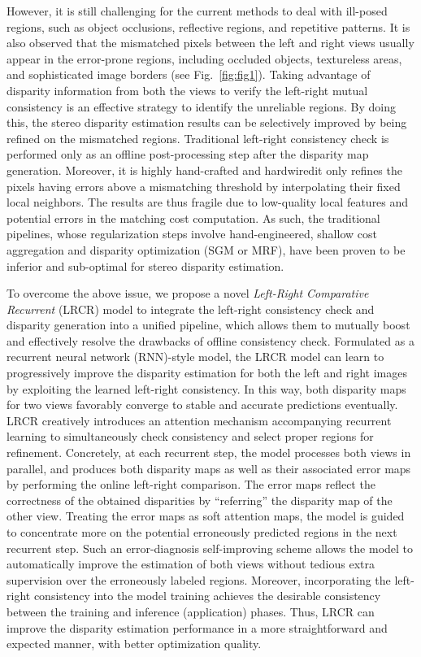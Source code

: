\documentclass[10pt,twocolumn,letterpaper]{article}
\begin{document}
However, it is still challenging for the current methods to deal with ill-posed regions, such as object occlusions, reflective regions, and repetitive patterns.  It is also observed that the mismatched pixels between the left and right views usually appear in the error-prone regions, including occluded objects, textureless areas, and sophisticated image borders (see Fig.~\ref{fig:fig1}).   Taking advantage of disparity information from  both the views to verify the left-right mutual consistency  is an effective strategy to identify the unreliable regions. By doing this,  the stereo disparity estimation results can be selectively improved by being refined on the mismatched regions. Traditional left-right consistency check is performed only as an offline post-processing step after the disparity map generation. Moreover, it is highly hand-crafted and hardwired\textemdash it only refines the pixels having errors   above a   mismatching threshold by interpolating their fixed local neighbors. The results are thus fragile due to low-quality local features and potential errors in the matching cost computation.  As such,  the traditional pipelines, whose regularization steps involve hand-engineered, shallow cost aggregation and disparity optimization (SGM or MRF), have been proven to be inferior \cite{seki2016patch} and sub-optimal for  stereo disparity estimation. 

To overcome the above issue, we propose a novel \textit{Left-Right Comparative Recurrent} (LRCR) model to integrate the left-right consistency check and disparity generation into a unified pipeline, which allows them to mutually boost and effectively resolve the drawbacks of   offline  consistency check. Formulated as a recurrent neural network (RNN)-style model, the LRCR model can learn to progressively improve the disparity estimation for both the left and right images by exploiting  the learned left-right consistency. In this way, both  disparity maps for two views favorably converge to stable and accurate predictions eventually. LRCR creatively introduces an  attention mechanism accompanying recurrent learning to  simultaneously check consistency  and select proper regions for refinement. Concretely,  at each recurrent step, the model processes both views in parallel, and produces both disparity maps as well as their associated error maps by performing the online left-right comparison. The error maps reflect the correctness of the obtained disparities by ``referring'' the disparity map of the other view. Treating the error maps as  soft attention maps, the model is guided to concentrate more on the potential erroneously predicted regions in the next recurrent step. Such an error-diagnosis self-improving scheme allows the model to automatically improve the estimation of both views without tedious extra supervision over  the erroneously labeled regions. Moreover, incorporating the left-right consistency into the model training achieves the desirable consistency between the training and inference (application) phases. Thus, LRCR can improve the disparity estimation performance in a more straightforward and expected manner, with better optimization quality.
\end{document}
